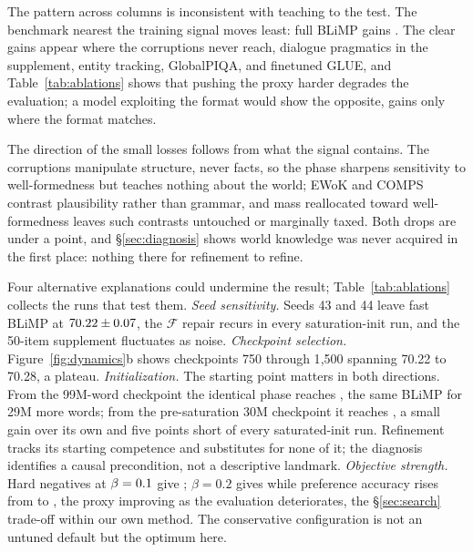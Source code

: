 The pattern across columns is inconsistent with teaching to the test. The
benchmark nearest the training signal moves least: full BLiMP gains
\rBlimpDeltaFull{}. The clear gains appear where the corruptions never
reach, dialogue pragmatics in the supplement, entity tracking, GlobalPIQA,
and finetuned GLUE, and Table~\ref{tab:ablations} shows that pushing the
proxy harder degrades the evaluation; a model exploiting the format would
show the opposite, gains only where the format matches.

The direction of the small losses follows from what the signal contains.
The corruptions manipulate structure, never facts, so the phase sharpens
sensitivity to well-formedness but teaches nothing about the world; EWoK
and COMPS contrast plausibility rather than grammar, and mass reallocated
toward well-formedness leaves such contrasts untouched or marginally
taxed. Both drops are under a point, and \S\ref{sec:diagnosis} shows world
knowledge was never acquired in the first place: nothing there for
refinement to refine.

\label{sec:results-ablations}



Four alternative explanations could undermine the result;
Table~\ref{tab:ablations}
collects the runs that test them. \emph{Seed sensitivity.} Seeds 43 and 44
leave fast BLiMP at $70.22\pm0.07$, the $\mathcal{F}$
repair recurs in every saturation-init run, and the 50-item supplement
fluctuates as noise. \emph{Checkpoint selection.} Figure~\ref{fig:dynamics}b
shows checkpoints 750 through 1{,}500 spanning 70.22 to 70.28, a plateau.
\emph{Initialization.} The starting point matters in both directions.
From the 99M-word checkpoint the identical phase reaches \rInitFinalB{},
the same BLiMP for 29M more words; from the pre-saturation
30M checkpoint it reaches \rInitThirtyB{}, a small gain over its own
\rThirtyBaseB{} and five points short of every saturated-init run.
Refinement tracks its starting competence and substitutes for none of it;
the diagnosis identifies a causal precondition, not a descriptive
landmark. \emph{Objective strength.} Hard negatives at $\beta=0.1$ give
\rHardNegB{}; $\beta{=}0.2$ gives \rVtwoB{} while preference accuracy rises
from \rPrefAcc{} to \rPrefAccHard{}, the proxy improving as the evaluation
deteriorates, the \S\ref{sec:search} trade-off within our own method. The
conservative configuration is not an untuned default but the optimum here.


